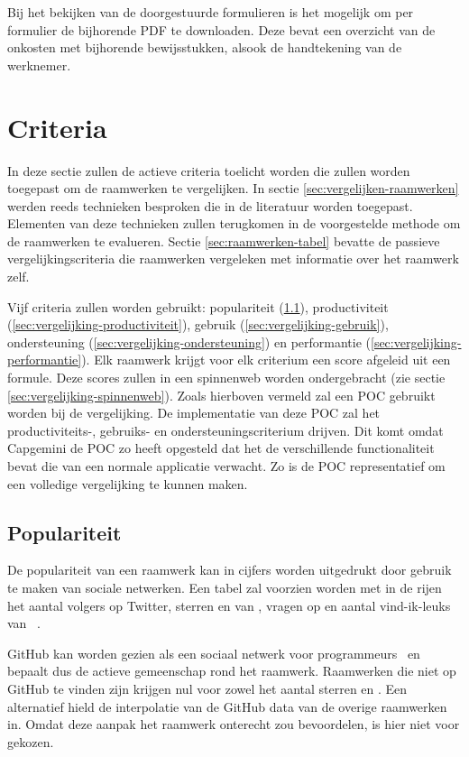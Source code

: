 Bij het bekijken van de doorgestuurde formulieren is het mogelijk om per formulier de bijhorende PDF te downloaden. 
Deze bevat een overzicht van de onkosten met bijhorende bewijsstukken, alsook de handtekening van de werknemer.

\section{Criteria}
\label{sec:vergelijking-criteria}

In deze sectie zullen de actieve criteria toelicht worden die zullen worden toegepast om de raamwerken te vergelijken.
In sectie \ref{sec:vergelijken-raamwerken} werden reeds technieken besproken die in de literatuur worden toegepast.
Elementen van deze technieken zullen terugkomen in de voorgestelde methode om de raamwerken te evalueren.
Sectie \ref{sec:raamwerken-tabel} bevatte de passieve vergelijkingscriteria die raamwerken vergeleken met informatie over het raamwerk zelf.

Vijf criteria zullen worden gebruikt: populariteit (\ref{sec:vergelijking-populariteit}), productiviteit (\ref{sec:vergelijking-productiviteit}), gebruik (\ref{sec:vergelijking-gebruik}), ondersteuning (\ref{sec:vergelijking-ondersteuning}) en performantie (\ref{sec:vergelijking-performantie}). 
Elk raamwerk krijgt voor elk criterium een score afgeleid uit een formule. 
Deze scores zullen in een spinnenweb worden ondergebracht (zie sectie \ref{sec:vergelijking-spinnenweb}).
Zoals hierboven vermeld zal een POC gebruikt worden bij de vergelijking.
De implementatie van deze POC zal het productiviteits-, gebruiks- en ondersteuningscriterium drijven.  
Dit komt omdat Capgemini de POC zo heeft opgesteld dat het de verschillende functionaliteit bevat die van een normale applicatie verwacht.
Zo is de POC representatief om een volledige vergelijking te kunnen maken.

\subsection{Populariteit}
\label{sec:vergelijking-populariteit}
De populariteit van een raamwerk kan in cijfers worden uitgedrukt door gebruik te maken van sociale netwerken. 
Een tabel zal voorzien worden met in de rijen het aantal volgers op Twitter, sterren en  van \gh{},  vragen op \so{} en aantal vind-ik-leuks van \fb{}~\cite{Sarrafi2012a,Ayuso2012}. 

GitHub kan worden gezien als een sociaal netwerk voor programmeurs~\cite{Catone2008} en bepaalt dus de actieve gemeenschap rond het raamwerk.
Raamwerken die niet op GitHub te vinden zijn krijgen nul voor zowel het aantal sterren en .
Een alternatief hield de interpolatie van de GitHub data van de overige raamwerken in.
Omdat deze aanpak het raamwerk onterecht zou bevoordelen, is hier niet voor gekozen.

